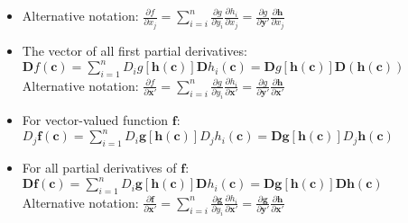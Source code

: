 \documentclass[a4paper]{article}
\newcommand{\mb}{\mathbf}
\begin{document}
\begin{itemize}
\begin{itemize}
 \item Alternative notation: $\frac{\partial f}{\partial x_j} = \sum_{i=i}^n \frac{\partial g}{\partial y_i }\frac{\partial h_i}{\partial  x_j} = \frac{\partial g}{\partial \mb{y}'}\frac{\partial \mb{h}}{\partial x_j}$
\item The vector of all first partial derivatives:\\
$\mb{D}f(\mb{c}) = \sum_{i=1}^n D_i g[\mb{h(c)}]\mb{D}h_i (\mb{c}) = \mb{D}g[\mb{h(c)}]\mb{D(h(c))}$ \\
Alternative notation: $\frac{\partial f}{\partial \mb{x}'} = \sum_{i=i}^n \frac{\partial g}{\partial y_i }\frac{\partial h_i}{\partial  \mb{x}'} = \frac{\partial g}{\partial \mb{y}'}\frac{\partial \mb{h}}{\partial \mb{x}'}$
 \item For vector-valued function $\mb{f}$: \\
 $D_j \mb{f(c)} = \sum\limits_{i=1}^n D_i\mb{g[h(c)]}D_j h_i(\mb{c}) = \mb{Dg[h(c)]}D_j\mb{h(c)}$
\item For all partial derivatives of $\mb{f}$: \\
 $\mb{Df(c)}=\sum\limits_{i=1}^n D_i \mb{g[h(c)]}\mb{D}h_i(\mb{c})=\mb{Dg[h(c)]Dh(c)}$\\
 Alternative notation: $\frac{\partial \mb{f}}{\partial \mb{x}'} = \sum_{i=i}^n \frac{\partial \mb{g}}{\partial y_i }\frac{\partial h_i}{\partial  \mb{x}'} = \frac{\partial \mb{g}}{\partial \mb{y}'}\frac{\partial \mb{h}}{\partial \mb{x}'}$
\end{itemize}
\end{itemize}
\end{document}
